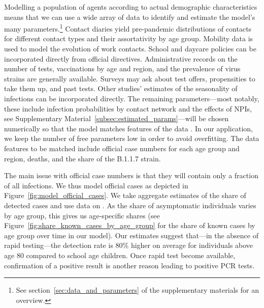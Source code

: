 Modelling a population of agents according to actual demographic characteristics means
that we can use a wide array of data to identify and estimate the model's many
parameters.\footnote{See section~\ref{sec:data_and_parameters} of the supplementary
materials for an overview.} Contact diaries yield pre-pandemic distributions of contacts
for different contact types and their assortativity by age group. Mobility data is used
to model the evolution of work contacts. School and daycare policies can be incorporated
directly from official directives. Administrative records on the number of tests,
vaccinations by age and region, and the prevalence of virus strains are generally
available. Surveys may ask about test offers, propensities to take them up, and past
tests. Other studies' estimates of the seasonality of infections can be incorporated
directly. The remaining parameters---most notably, these include infection probabilities
by contact network and the effects of NPIs, see Supplementary
Material~\ref{subsec:estimated_params}---will be chosen numerically so that the model
matches features of the data \citep[see][for the general method, also described in
Supplementary Material \ref{sec:model}]{McFadden1989}. In our application, we keep the number of
free parameters low in order to avoid overfitting. The data features to be matched
include official case numbers for each age group and region, deaths, and the share of
the B.1.1.7 strain.

The main issue with official case numbers is that they will contain only a fraction of
all infections. We thus model official cases as depicted in
Figure~\ref{fig:model_official_cases}. We take aggregate estimates of the share of
detected cases and use data on . As the share
of asymptomatic individuals varies by age group, this gives us age-specific shares (see
Figure~\ref{fig:share_known_cases_by_age_group} for the share of known cases by age group
over time in our model). Our estimates suggest that---in the absence of rapid
testing---the detection rate is 80\% higher on average for individuals above age 80
compared to school age children. Once rapid test become available, confirmation of a
positive result is another reason leading to positive PCR tests.

